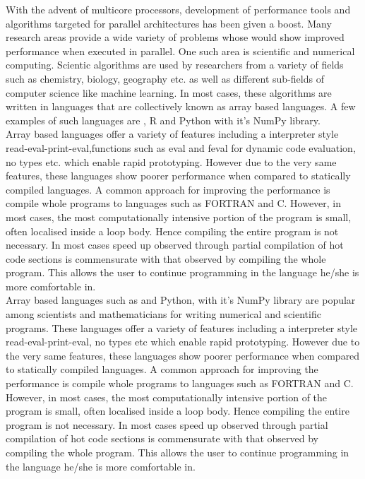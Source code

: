 With the advent of multicore processors, development of performance tools and algorithms targeted for parallel architectures has been given a boost. Many research areas  provide a wide variety of problems whose would show improved performance when executed in parallel. One such area is scientific and numerical computing. Scientic algorithms are used by researchers from a variety of fields such as chemistry, biology, geography etc. as well as different sub-fields of computer science like machine learning. In most cases, these algorithms are written in languages  that are collectively known as  array based languages. A few examples of such languages are  \matlab, R and Python with it's NumPy library.\\
Array based languages offer a variety of features including a interpreter style read-eval-print-eval,functions such as eval and feval for dynamic code evaluation,  no types etc. which enable rapid prototyping. However due to the very same features, these languages show poorer performance when compared to statically compiled languages. A common approach for improving the performance is compile whole programs to languages such as {\sc FORTRAN} and C. However, in most cases, the most computationally intensive portion of the program is small, often localised inside a loop body. Hence compiling the entire program is not necessary. In most cases speed up observed through partial compilation of hot code sections is commensurate with that observed by compiling the whole program. This allows the user to continue programming in the language he/she is more comfortable in.\\
Array based languages such as \matlab \cite{matlab} and Python, with it's NumPy library are popular among scientists and mathematicians for writing   numerical and scientific programs. These languages offer a variety of features including a interpreter style read-eval-print-eval, no types etc which enable rapid prototyping. However due to the very same features, these languages show poorer performance when compared to statically compiled languages. A common approach for improving the performance is compile whole programs to languages such as {\sc FORTRAN} and C. However, in most cases, the most computationally intensive portion of the program is small, often localised inside a loop body. Hence compiling the entire program is not necessary. In most cases speed up observed through partial compilation of hot code sections is commensurate with that observed by compiling the whole program. This allows the user to continue programming in the language he/she is more comfortable in.\\

